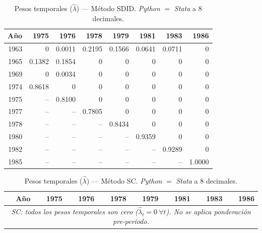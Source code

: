\begin{table}[H]
\centering
\caption{Pesos temporales ($\hat{\lambda}$) --- M\'etodo SDID. \textit{Python} $=$ \textit{Stata} a 8 decimales.}
\label{tab:lambda_sdid}
\small
\begin{tabular}{rrrrrrrr}
\toprule
A\~{n}o & 1975 & 1976 & 1978 & 1979 & 1981 & 1983 & 1986 \\
\midrule
1963 & 0 & 0.0011 & 0.2195 & 0.1566 & 0.0641 & 0.0711 & 0 \\
1965 & 0.1382 & 0.1854 & 0 & 0 & 0 & 0 & 0 \\
1969 & 0 & 0.0034 & 0 & 0 & 0 & 0 & 0 \\
1974 & 0.8618 & 0 & 0 & 0 & 0 & 0 & 0 \\
1975 & -- & 0.8100 & 0 & 0 & 0 & 0 & 0 \\
1977 & -- & -- & 0.7805 & 0 & 0 & 0 & 0 \\
1978 & -- & -- & -- & 0.8434 & 0 & 0 & 0 \\
1980 & -- & -- & -- & -- & 0.9359 & 0 & 0 \\
1982 & -- & -- & -- & -- & -- & 0.9289 & 0 \\
1985 & -- & -- & -- & -- & -- & -- & 1.0000 \\
\bottomrule
\end{tabular}
\end{table}


\begin{table}[H]
\centering
\caption{Pesos temporales ($\hat{\lambda}$) --- M\'etodo SC. \textit{Python} $=$ \textit{Stata} a 8 decimales.}
\label{tab:lambda_sc}
\small
\begin{tabular}{rrrrrrrr}
\toprule
A\~{n}o & 1975 & 1976 & 1978 & 1979 & 1981 & 1983 & 1986 \\
\midrule
\multicolumn{8}{c}{\textit{SC: todos los pesos temporales son cero ($\hat{\lambda}_t = 0\ \forall t$). No se aplica ponderaci\'on pre-periodo.}} \\
\bottomrule
\end{tabular}
\end{table}


